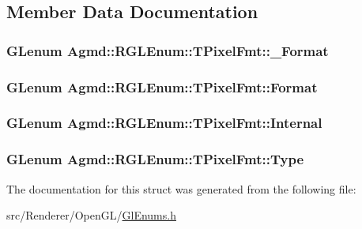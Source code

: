 \subsection{Member Data Documentation}
\hypertarget{struct_agmd_1_1_r_g_l_enum_1_1_t_pixel_fmt_a5c9cf05464fa12fade8a7348e73a5477}{
\subsubsection[{\+\_\+\+Format}]{\setlength{\rightskip}{0pt plus 5cm}G\+Lenum Agmd\+::\+R\+G\+L\+Enum\+::\+T\+Pixel\+Fmt\+::\+\_\+\+Format}}\label{struct_agmd_1_1_r_g_l_enum_1_1_t_pixel_fmt_a5c9cf05464fa12fade8a7348e73a5477}
\hypertarget{struct_agmd_1_1_r_g_l_enum_1_1_t_pixel_fmt_aab183e4deb51de4d53046260176851cb}{
\subsubsection[{Format}]{\setlength{\rightskip}{0pt plus 5cm}G\+Lenum Agmd\+::\+R\+G\+L\+Enum\+::\+T\+Pixel\+Fmt\+::\+Format}}\label{struct_agmd_1_1_r_g_l_enum_1_1_t_pixel_fmt_aab183e4deb51de4d53046260176851cb}
\hypertarget{struct_agmd_1_1_r_g_l_enum_1_1_t_pixel_fmt_ad238c5e11a0fda9403c572d75b3654b5}{
\subsubsection[{Internal}]{\setlength{\rightskip}{0pt plus 5cm}G\+Lenum Agmd\+::\+R\+G\+L\+Enum\+::\+T\+Pixel\+Fmt\+::\+Internal}}\label{struct_agmd_1_1_r_g_l_enum_1_1_t_pixel_fmt_ad238c5e11a0fda9403c572d75b3654b5}
\hypertarget{struct_agmd_1_1_r_g_l_enum_1_1_t_pixel_fmt_acb87a50325e7fac7df121e6d96da8806}{
\subsubsection[{Type}]{\setlength{\rightskip}{0pt plus 5cm}G\+Lenum Agmd\+::\+R\+G\+L\+Enum\+::\+T\+Pixel\+Fmt\+::\+Type}}\label{struct_agmd_1_1_r_g_l_enum_1_1_t_pixel_fmt_acb87a50325e7fac7df121e6d96da8806}


The documentation for this struct was generated from the following file\+:\begin{DoxyCompactItemize}
\item 
src/\+Renderer/\+Open\+G\+L/\hyperlink{_gl_enums_8h}{Gl\+Enums.\+h}\end{DoxyCompactItemize}
